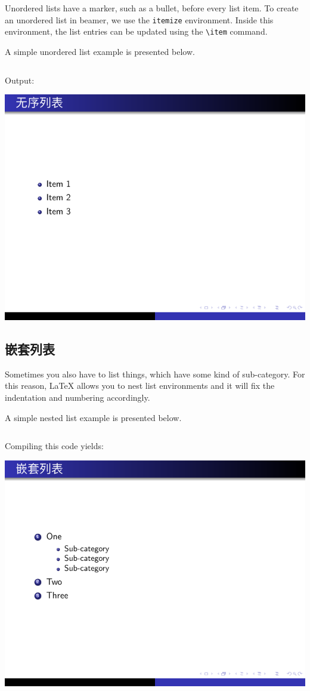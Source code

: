 Unordered lists have a marker, such as a bullet, before every list item. To create an unordered list in beamer, we use the \verb|itemize| environment. Inside this environment, the list entries can be updated using the \verb|\item| command.

A simple unordered list example is presented below.

\inputminted[linenos=true]{latex}{examples/beamer/list-unordered.tex}

Output:

\includegraphics{examples/beamer/list-unordered.pdf}

\subsection{嵌套列表}

Sometimes you also have to list things, which have some kind of sub-category. For this reason, LaTeX allows you to nest list environments and it will fix the indentation and numbering accordingly.

A simple nested list example is presented below.

\inputminted[linenos=true]{latex}{examples/beamer/list-nested.tex}

Compiling this code yields:

\includegraphics{examples/beamer/list-nested.pdf}

